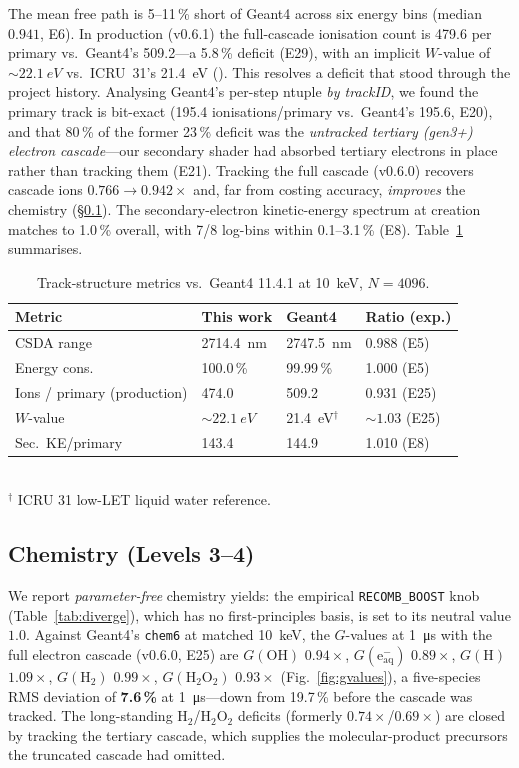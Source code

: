 \documentclass[11pt]{article}
\begin{document}
The mean free path is 5--11\,\% short of Geant4 across six energy bins
(median $0.941$, E6). In production (v0.6.1) the full-cascade ionisation count
is \num{479.6} per primary vs.\ Geant4's \num{509.2}---a 5.8\,\% deficit (E29),
with an implicit $W$-value of ${\sim}\SI{22.1}{eV}$ vs.\ ICRU~31's \SI{21.4}{eV}
(\cite{icru31}). This resolves a deficit that stood through the project history.
Analysing Geant4's per-step ntuple \emph{by trackID}, we found the primary track
is bit-exact (\num{195.4} ionisations/primary vs.\ Geant4's \num{195.6}, E20),
and that 80\,\% of the former 23\,\% deficit was the \emph{untracked tertiary
(gen3+) electron cascade}---our secondary shader had absorbed tertiary electrons
in place rather than tracking them (E21). Tracking the full cascade (v0.6.0)
recovers cascade ions $0.766\to0.942\times$ and, far from costing accuracy,
\emph{improves} the chemistry (\S\ref{sec:chem}). The
secondary-electron kinetic-energy spectrum at creation matches to 1.0\,\%
overall, with 7/8 log-bins within 0.1--3.1\,\% (E8). Table~\ref{tab:track}
summarises.

\begin{table}[t]\centering\footnotesize
\caption{Track-structure metrics vs.\ Geant4 11.4.1 at \SI{10}{keV},
$N=4096$.}
\label{tab:track}
\begin{tabular}{@{}llll@{}}
\toprule
Metric & This work & Geant4 & Ratio (exp.) \\
\midrule
CSDA range & \SI{2714.4}{nm} & \SI{2747.5}{nm} & 0.988 (E5) \\
Energy cons. & 100.0\,\% & 99.99\,\% & 1.000 (E5) \\
Ions / primary (production) & 474.0 & 509.2 & 0.931 (E25) \\
$W$-value & ${\sim}\SI{22.1}{eV}$ & \SI{21.4}{eV}$^\dagger$ & ${\sim}1.03$ (E25) \\
Sec.\ KE/primary & 143.4 & 144.9 & 1.010 (E8) \\
\bottomrule
\end{tabular}
\\[0.3em]{\scriptsize $^\dagger$ ICRU 31 low-LET liquid water reference.}
\end{table}

\subsection{Chemistry (Levels 3--4)}\label{sec:chem}
We report \emph{parameter-free} chemistry yields: the empirical
\texttt{RECOMB\_BOOST} knob (Table~\ref{tab:diverge}), which has no
first-principles basis, is set to its neutral value $1.0$. Against Geant4's
\texttt{chem6} at matched \SI{10}{keV}, the $G$-values at \SI{1}{\micro s}
with the full electron cascade (v0.6.0, E25) are
$G(\mathrm{OH})$ $0.94\times$, $G(\mathrm{e^-_{aq}})$ $0.89\times$,
$G(\mathrm{H})$ $1.09\times$, $G(\mathrm{H_2})$ $0.99\times$,
$G(\mathrm{H_2O_2})$ $0.93\times$ (Fig.~\ref{fig:gvalues}), a five-species RMS
deviation of \textbf{7.6\,\%} at \SI{1}{\micro s}---down from 19.7\,\% before the
cascade was tracked. The long-standing $\mathrm{H_2}$/$\mathrm{H_2O_2}$ deficits
(formerly $0.74\times$/$0.69\times$) are closed by tracking the tertiary cascade,
which supplies the molecular-product precursors the truncated cascade had
omitted.
\end{document}
